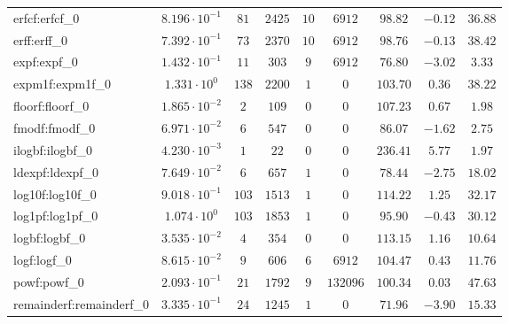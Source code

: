 \begin{tabular}{|l|c|c|c|c|c|c|c|c|}
erfcf:erfcf\_0               & $ 8.196 \cdot 10^{-1} $ & $ 81     $ & $ 2425  $ & $ 10  $ & $ 6912   $ & $ 98.82       $ & $ -0.12   $ & $ 36.88   $ \\
erff:erff\_0                 & $ 7.392 \cdot 10^{-1} $ & $ 73     $ & $ 2370  $ & $ 10  $ & $ 6912   $ & $ 98.76       $ & $ -0.13   $ & $ 38.42   $ \\
expf:expf\_0                 & $ 1.432 \cdot 10^{-1} $ & $ 11     $ & $ 303   $ & $ 9   $ & $ 6912   $ & $ 76.80       $ & $ -3.02   $ & $ 3.33    $ \\
expm1f:expm1f\_0             & $ 1.331 \cdot 10^{0}  $ & $ 138    $ & $ 2200  $ & $ 1   $ & $ 0      $ & $ 103.70      $ & $ 0.36    $ & $ 38.22   $ \\
floorf:floorf\_0             & $ 1.865 \cdot 10^{-2} $ & $ 2      $ & $ 109   $ & $ 0   $ & $ 0      $ & $ 107.23      $ & $ 0.67    $ & $ 1.98    $ \\
fmodf:fmodf\_0               & $ 6.971 \cdot 10^{-2} $ & $ 6      $ & $ 547   $ & $ 0   $ & $ 0      $ & $ 86.07       $ & $ -1.62   $ & $ 2.75    $ \\
ilogbf:ilogbf\_0             & $ 4.230 \cdot 10^{-3} $ & $ 1      $ & $ 22    $ & $ 0   $ & $ 0      $ & $ 236.41      $ & $ 5.77    $ & $ 1.97    $ \\
ldexpf:ldexpf\_0             & $ 7.649 \cdot 10^{-2} $ & $ 6      $ & $ 657   $ & $ 1   $ & $ 0      $ & $ 78.44       $ & $ -2.75   $ & $ 18.02   $ \\
log10f:log10f\_0             & $ 9.018 \cdot 10^{-1} $ & $ 103    $ & $ 1513  $ & $ 1   $ & $ 0      $ & $ 114.22      $ & $ 1.25    $ & $ 32.17   $ \\
log1pf:log1pf\_0             & $ 1.074 \cdot 10^{0}  $ & $ 103    $ & $ 1853  $ & $ 1   $ & $ 0      $ & $ 95.90       $ & $ -0.43   $ & $ 30.12   $ \\
logbf:logbf\_0               & $ 3.535 \cdot 10^{-2} $ & $ 4      $ & $ 354   $ & $ 0   $ & $ 0      $ & $ 113.15      $ & $ 1.16    $ & $ 10.64   $ \\
logf:logf\_0                 & $ 8.615 \cdot 10^{-2} $ & $ 9      $ & $ 606   $ & $ 6   $ & $ 6912   $ & $ 104.47      $ & $ 0.43    $ & $ 11.76   $ \\
powf:powf\_0                 & $ 2.093 \cdot 10^{-1} $ & $ 21     $ & $ 1792  $ & $ 9   $ & $ 132096 $ & $ 100.34      $ & $ 0.03    $ & $ 47.63   $ \\
remainderf:remainderf\_0     & $ 3.335 \cdot 10^{-1} $ & $ 24     $ & $ 1245  $ & $ 1   $ & $ 0      $ & $ 71.96       $ & $ -3.90   $ & $ 15.33   $ \\

\end{tabular}
